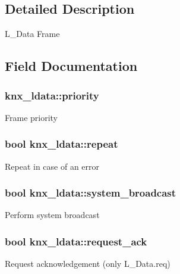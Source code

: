 \subsection{Detailed Description}
L\+\_\+\+Data Frame 

\subsection{Field Documentation}
\subsubsection[{\texorpdfstring{priority}{priority}}]{ knx\+\_\+ldata\+::priority}\hypertarget{structknx__ldata_a87741fe097735a5f77fcd73ebecc4d30}{}\label{structknx__ldata_a87741fe097735a5f77fcd73ebecc4d30}
Frame priority 
\subsubsection[{\texorpdfstring{repeat}{repeat}}]{\setlength{\rightskip}{0pt plus 5cm}bool knx\+\_\+ldata\+::repeat}\hypertarget{structknx__ldata_a8f5c98118b6a2fbbd902a700699ef0a7}{}\label{structknx__ldata_a8f5c98118b6a2fbbd902a700699ef0a7}
Repeat in case of an error 
\subsubsection[{\texorpdfstring{system\+\_\+broadcast}{system_broadcast}}]{\setlength{\rightskip}{0pt plus 5cm}bool knx\+\_\+ldata\+::system\+\_\+broadcast}\hypertarget{structknx__ldata_a33061511aae90bd36a73153cf461ae14}{}\label{structknx__ldata_a33061511aae90bd36a73153cf461ae14}
Perform system broadcast 
\subsubsection[{\texorpdfstring{request\+\_\+ack}{request_ack}}]{\setlength{\rightskip}{0pt plus 5cm}bool knx\+\_\+ldata\+::request\+\_\+ack}\hypertarget{structknx__ldata_a4dcd21b2f2cb1e105bf8eeffea378af3}{}\label{structknx__ldata_a4dcd21b2f2cb1e105bf8eeffea378af3}
Request acknowledgement (only L\+\_\+\+Data.\+req) 

